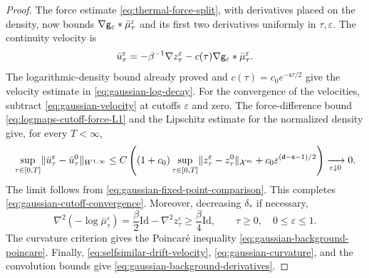 \documentclass[11pt,reqno]{amsart}
\numberwithin{equation}{section}
\theoremstyle{plain}
\theoremstyle{remark}
\DeclarePairedDelimiter{\norm}{\lVert}{\rVert}
\renewcommand{\d}{\mathsf{d}}\newcommand{\s}{\mathsf{s}}
\newcommand{\Xspace}{\mathcal X}
\newcommand{\Id}{\mathrm{Id}}
\begin{document}
\begin{proof}
The force estimate \eqref{eq:thermal-force-split}, with derivatives placed on the density, now bounds $\nabla\mathsf g_\varepsilon*\bar\mu_\tau^\varepsilon$ and its first two derivatives uniformly in $\tau,\varepsilon$. The continuity velocity is
\begin{equation}\label{eq:gaussian-velocity}
 \bar u_\tau^\varepsilon=-\beta^{-1}\nabla z_\tau^\varepsilon
        -c(\tau)\nabla\mathsf g_\varepsilon*\bar\mu_\tau^\varepsilon.
\end{equation}
The logarithmic-density bound already proved and $c(\tau)=c_0e^{-\s\tau/2}$ give the velocity estimate in \eqref{eq:gaussian-log-decay}. For the convergence of the velocities, subtract \eqref{eq:gaussian-velocity} at cutoffs $\varepsilon$ and zero. The force-difference bound \eqref{eq:logmaps-cutoff-force-L1} and the Lipschitz estimate for the normalized density give, for every $T<\infty$,
\begin{equation}\label{eq:gaussian-velocity-cutoff-comparison}
 \sup_{\tau\in[0,T]}\norm{\bar u_\tau^\varepsilon-\bar u_\tau^0}_{W^{1,\infty}}
 \le C\left((1+c_0)\sup_{\tau\in[0,T]}\norm{z_\tau^\varepsilon-z_\tau^0}_{\Xspace^m}
       +c_0\varepsilon^{(\d-\s-1)/2}\right)\xrightarrow[\varepsilon\downarrow0]{}0.
\end{equation}
The limit follows from \eqref{eq:gaussian-fixed-point-comparison}. This completes \eqref{eq:gaussian-cutoff-convergence}. Moreover, decreasing $\delta_*$ if necessary,
\begin{equation}\label{eq:gaussian-curvature}
 \nabla^2(-\log\bar\mu_\tau^\varepsilon)
 =\frac\beta2\Id-\nabla^2z_\tau^\varepsilon
 \ge\frac\beta4\Id,\qquad \tau\ge0,\quad0\le\varepsilon\le1.
\end{equation}
The curvature criterion \cite[Section~4.8]{BGL} gives the Poincar\'e inequality \eqref{eq:gaussian-background-poincare}. Finally, \eqref{eq:selfsimilar-drift-velocity}, \eqref{eq:gaussian-curvature}, and the convolution bounds give \eqref{eq:gaussian-background-derivatives}.
\end{proof}
\end{document}
